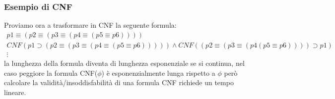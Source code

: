 \documentclass[../main.tex]{subfiles}
\begin{document}
    \subsubsection{Esempio di CNF}
    Proviamo ora a trasformare in CNF la seguente formula:
    \begin{gather*}
        p1 \equiv (p2 \equiv (p3 \equiv (p4 \equiv (p5 \equiv p6)))) \\
        CNF(p1 \supset (p2 \equiv (p3 \equiv (p4 \equiv (p5 \equiv p6))))) \land CNF((p2 \equiv (p3 \equiv (p4(p5 \equiv p6)))) \supset p1)\\
        \vdots
    \end{gather*}
    la lunghezza della formula diventa di lunghezza esponenziale se si continua, nel caso peggiore la formula CNF($\phi$) è esponenzialmente lunga rispetto a $\phi$ però calcolare la validità/insoddisfabilità di una formula CNF richiede un tempo lineare.
\end{document}
